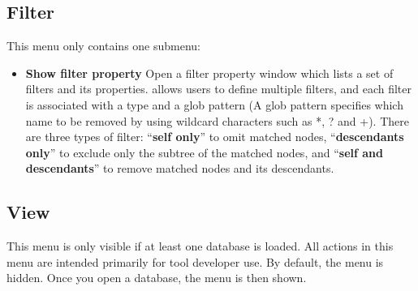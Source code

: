 \documentclass[english]{article}
\begin{document}

\subsection{Filter}
This menu only contains one submenu:
\begin{itemize}
 \item \textbf{Show filter property}
  Open a filter property window which lists a set of filters and its properties.
 allows  users to define multiple filters, and each filter is associated with a type and a glob pattern (A glob pattern specifies which name to be removed by using wildcard characters such as *, ? and +).
There are three types of filter: ``\textbf{self only}'' to omit matched nodes, 
``\textbf{descendants only}'' to exclude only the subtree of the matched nodes, and ``\textbf{self and descendants}'' to
remove matched nodes and its descendants.

\end{itemize}


\subsection{View}
This menu is only visible if at least one database is loaded.
All actions in this menu are intended primarily for tool developer use. 
By default, the menu is hidden. Once you open a database, the menu is then shown.
\end{document}
